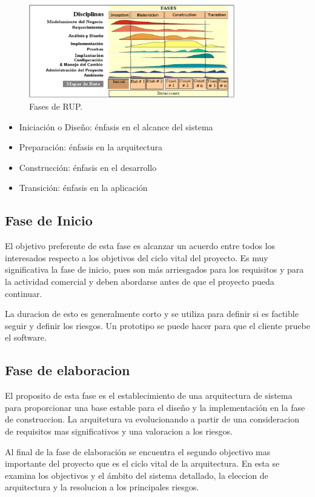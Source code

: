 \documentclass[spanish]{udpreport}
\begin{document}
\begin{figure}[!h]
	\centering
	\includegraphics[width=0.8\textwidth]{fases.png}
	\caption{\label{fig:fases}Fases de RUP.}
\end{figure}

\begin{itemize}
\item Iniciación o Diseño: énfasis en el alcance del sistema
\item Preparación: énfasis en la arquitectura
\item Construcción: énfasis en el desarrollo
\item Transición: énfasis en la aplicación

\end{itemize}

\subsection{Fase de Inicio}
\label{subsec:inicio}
El objetivo preferente de esta fase es alcanzar un acuerdo entre todos los interesados respecto a los objetivos del ciclo vital del proyecto.
Es muy significativa la fase de inicio, pues son más arriesgados para los requisitos y para la actividad comercial y deben abordarse antes de que el proyecto pueda continuar.\par
La duracion de esto es generalmente corto y se utiliza para definir si es factible seguir y definir los riesgos. Un prototipo se puede hacer para que el cliente pruebe el software.\par


\subsection{Fase de elaboracion}
\label{subsec:elaboracion}
El proposito de esta fase es el establecimiento de una arquitectura de sistema para proporcionar una base estable para el diseño y la implementación en la fase de construccion. La arquitetura va evolucionando  a partir de una consideracion de requisitos mas significativos y  una valoracion a los riesgos.\par
Al final de la fase de elaboración se encuentra el segundo objectivo mas importante del proyecto que es el ciclo vital de la arquitectura. En esta se examina los objectivos y el ámbito del sistema detallado, la eleccion de arquitectura y la resolucion a los principales riesgos.
\end{document}
